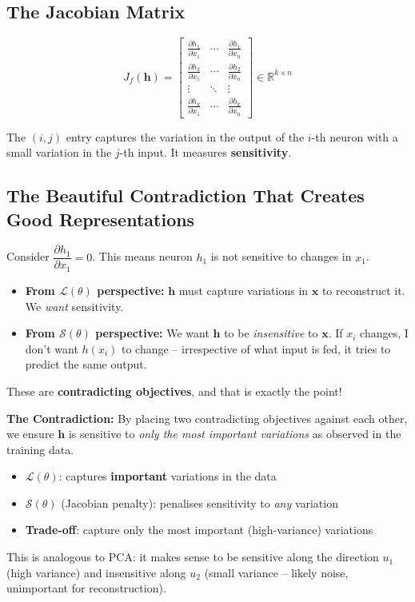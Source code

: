 \documentclass[12pt,a4paper]{article}
\newcommand{\R}{\mathbb{R}}
\newcommand{\vx}{\mathbf{x}}
\newcommand{\vh}{\mathbf{h}}
\newcommand{\Loss}{\mathcal{L}}
\newcommand{\Reg}{\mathcal{S}}
\begin{document}
\subsection{The Jacobian Matrix}

\[
J_f(\vh)
= \begin{bmatrix}
    \frac{\partial h_1}{\partial x_1} & \cdots & \frac{\partial h_1}{\partial x_n}\\
    \frac{\partial h_2}{\partial x_1} & \cdots & \frac{\partial h_2}{\partial x_n}\\
    \vdots & \ddots & \vdots\\
    \frac{\partial h_k}{\partial x_1} & \cdots & \frac{\partial h_k}{\partial x_n}
  \end{bmatrix}
\in \R^{k\times n}
\]

The $(i,j)$ entry captures the variation in the output of the $i$-th neuron with a small variation in the $j$-th input. It measures \textbf{sensitivity}.

\subsection{The Beautiful Contradiction That Creates Good Representations}

Consider $\dfrac{\partial h_1}{\partial x_1} = 0$. This means neuron $h_1$ is not sensitive to changes in $x_1$.

\begin{itemize}
  \item \textbf{From $\Loss(\theta)$ perspective:} $\vh$ must capture variations in $\vx$ to reconstruct it. We \emph{want} sensitivity.
  \item \textbf{From $\Reg(\theta)$ perspective:} We want $\vh$ to be \emph{insensitive} to $\vx$. If $x_i$ changes, I don't want $h(x_i)$ to change -- irrespective of what input is fed, it tries to predict the same output.
\end{itemize}

These are \textbf{contradicting objectives}, and that is exactly the point!

\begin{keybox}
\textbf{The Contradiction:}
By placing two contradicting objectives against each other, we ensure $\vh$ is sensitive to \emph{only the most important variations} as observed in the training data.

\begin{itemize}
  \item $\Loss(\theta)$: captures \textbf{important} variations in the data
  \item $\Reg(\theta)$ (Jacobian penalty): penalises sensitivity to \emph{any} variation
  \item \textbf{Trade-off}: capture only the most important (high-variance) variations
\end{itemize}

This is analogous to PCA: it makes sense to be sensitive along the direction $u_1$ (high variance) and insensitive along $u_2$ (small variance -- likely noise, unimportant for reconstruction).
\end{keybox}
\end{document}
